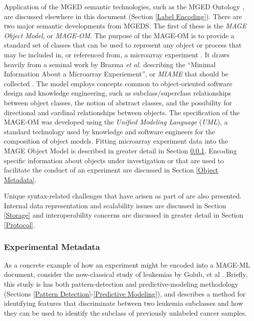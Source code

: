 Application of the MGED semantic technologies, such as the MGED Ontology
\cite{mo}, are discussed elsewhere in this document (Section \ref{Label
Encoding}).  There are two major semantic developments from MGEDS.  The first
of these is the \emph{MAGE Object Model}, or \emph{MAGE-OM}.  The purpose of
the MAGE-OM is to provide a standard set of classes that can be used to
represent any object or process that may be included in, or referenced from, a
microarray experiment \cite{mage}.  It draws heavily from a seminal work by
Brazma \emph{et al.} describing the ``Minimal Information About a Microarray
Experiement'', or \emph{MIAME} that should be collected \cite{miame}.  The
model employs concepts common to object-oriented software design and knowledge
engineering, such as subclass/superclass relationships between object classes,
the notion of abstract classes, and the possibility for directional and
cardinal relationships between objects.  The specification of the MAGE-OM was
developed using the \emph{Unified Modeling Language} (\emph{UML}), a standard
technology used by knowledge and software engineers for the composition of
object models.  Fitting microarray experiment data into the MAGE Object Model
is described in greater detail in Section \ref{Experimental Metadata}.
Encoding specific information about objects under investigation or that are
used to facilitate the conduct of an experiment are discussed in Section
\ref{Object Metadata}.

Unique syntax-related challenges that have arisen as part of \dbthesis are also
presented.  Internal data representation and scalability issues are discussed
in Section \ref{Storage} and interoperability concerns are discussed in greater
detail in Section \ref{Protocol}.

\subsubsection{Experimental Metadata}
\label{Experimental Metadata}

As a concrete example of how an experiment might be encoded into a MAGE-ML
document, consider the now-classical study of leukemias by Golub, et al
\cite{golub}.  Briefly, this study is has both pattern-detection and
predictive-modeling methodology (Sections \ref{Pattern
Detection}-\ref{Predictive Modeling}), and describes a method for identifying
features that discriminate between two leukemia subclasses and how they can be
used to identify the subclass of previously unlabeled cancer samples.

